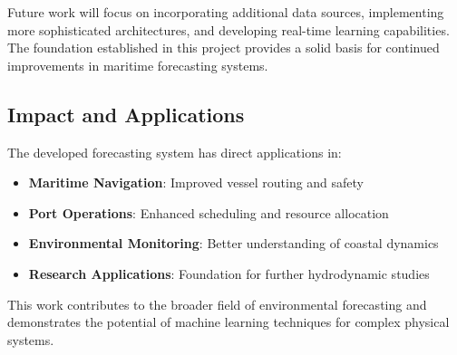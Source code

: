 \documentclass[12pt,a4paper]{article}
\begin{document}
Future work will focus on incorporating additional data sources, implementing more sophisticated architectures, and developing real-time learning capabilities. The foundation established in this project provides a solid basis for continued improvements in maritime forecasting systems.

\subsection{Impact and Applications}
The developed forecasting system has direct applications in:
\begin{itemize}
    \item \textbf{Maritime Navigation}: Improved vessel routing and safety
    \item \textbf{Port Operations}: Enhanced scheduling and resource allocation
    \item \textbf{Environmental Monitoring}: Better understanding of coastal dynamics
    \item \textbf{Research Applications}: Foundation for further hydrodynamic studies
\end{itemize}

This work contributes to the broader field of environmental forecasting and demonstrates the potential of machine learning techniques for complex physical systems.
\end{document}
